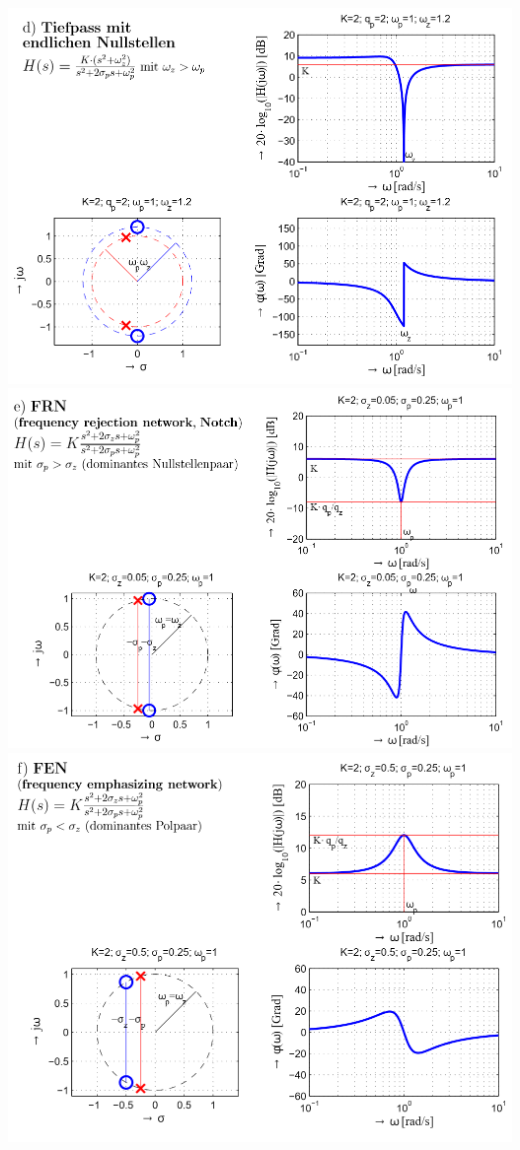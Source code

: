 \begin{center}
\includegraphics[width=0.8\columnwidth]{Images/tiefpass_en}\\
\includegraphics[width=0.8\columnwidth]{Images/frn}\\
\includegraphics[width=0.8\columnwidth]{Images/fen}\\
\end{center}

